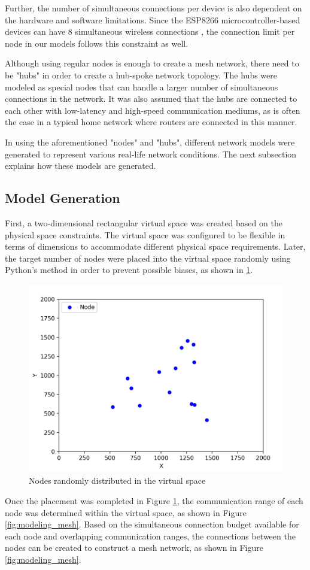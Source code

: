 Further, the number of simultaneous connections per device is also dependent on the hardware and software limitations. Since the ESP8266 microcontroller-based devices can have 8 simultaneous wireless connections \cite{ESP8266_NONOS_V1_1_0_Release_Notes}, the connection limit per node in our models follows this constraint as well.

Although using regular nodes is enough to create a mesh network, there need to be "hubs" in order to create a hub-spoke network topology. The hubs were modeled as special nodes that can handle a larger number of simultaneous connections in the network. It was also assumed that the hubs are connected to each other with low-latency and high-speed communication mediums, as is often the case in a typical home network where routers are connected in this manner. 

In using the aforementioned "nodes" and "hubs", different network models were generated to represent various real-life network conditions. The next subsection explains how these models are generated.


\newpage
\subsection{Model Generation}
\label{model-gen-section}
First, a two-dimensional rectangular virtual space was created based on the physical space constraints. The virtual space was configured to be flexible in terms of dimensions to accommodate different physical space requirements. Later, the target number of nodes were placed into the virtual space randomly using Python's  method in order to prevent possible biases, as shown in \ref{fig:modeling_node}.

\begin{figure}[H]
    \centering
    \includegraphics[width=0.35\columnwidth]{images/modeling_nodes_only.png}
    \caption{Nodes randomly distributed in the virtual space}
    \label{fig:modeling_node}
\end{figure}


Once the placement was completed in Figure \ref{fig:modeling_node}, the communication range of each node was determined within the virtual space, as shown in Figure \ref{fig:modeling_mesh}. Based on the simultaneous connection budget available for each node and overlapping communication ranges, the connections between the nodes can be created to construct a mesh network, as shown in Figure \ref{fig:modeling_mesh}.

